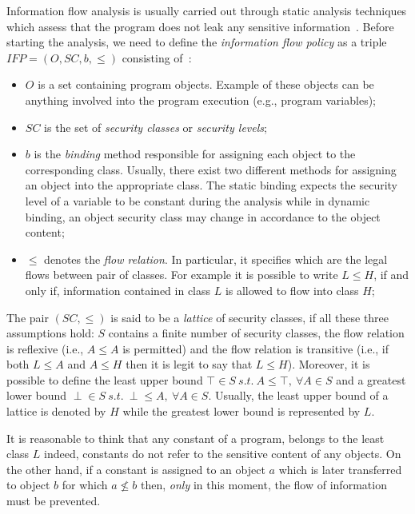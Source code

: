 \documentclass[LaM,binding=0.6cm]{sapthesis}
\begin{document}
Information flow analysis is usually carried out through static analysis techniques which assess that the program does not leak any sensitive information~\cite{smith2007principles}. Before starting the analysis, we need to define the \textit{information flow policy} as a triple $IFP = (O, SC, b, \leq)$ consisting of~\cite{denning1977certification}:
\begin{itemize}
\item $O$ is a set containing program objects. Example of these objects can be anything involved into the program execution (e.g., program variables);
\item $SC$ is the set of \textit{security classes} or \textit{security levels};
\item $b$ is the \textit{binding} method responsible for assigning each object to the corresponding class. Usually, there exist two different methods for assigning an object into the appropriate class. The static binding expects the security level of a variable to be constant during the analysis while in dynamic binding, an object security class may change in accordance to the object content;
\item $\leq$ denotes the \textit{flow relation}. In particular, it specifies which are the legal flows between pair of classes. For example it is possible to write $L \leq H$, if and only if, information contained in class $L$ is allowed to flow into class $H$;
\end{itemize}
The pair $(SC, \leq)$ is said to be a \textit{lattice} of security classes, if all these three assumptions hold: $S$ contains a finite number of security classes, the flow relation is reflexive (i.e., $A \leq A$ is permitted) and the flow relation is transitive (i.e., if both $L \leq A$ and $A \leq H$ then it is legit to say that $L \leq H$). Moreover, it is possible to define the least upper bound $\top \in S \ s.t. \ A \leq \top, \ \forall A \in S$ and a greatest lower bound $\perp \in S \ s.t. \ \perp \leq A, \ \forall A \in S$. Usually, the least upper bound of a lattice is denoted by $H$ while the greatest lower bound is represented by $L$.

It is reasonable to think that any constant of a program, belongs to the least class $L$ indeed, constants do not refer to the sensitive content of any objects. On the other hand, if a constant is assigned to an object $a$ which is later transferred to object $b$ for which $a \nleq b$ then, \textit{only} in this moment, the flow of information must be prevented.\\
\end{document}

